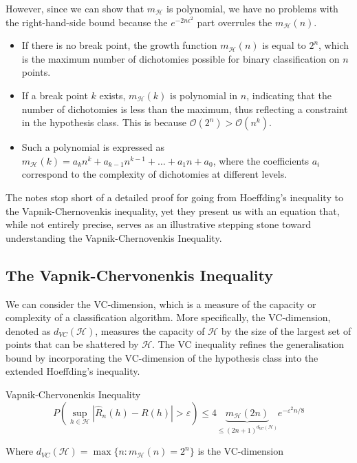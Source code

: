 However, since we can show that $m_{\mathcal{H}}$ is polynomial, we have no problems with the right-hand-side bound because the $e^{-2n\epsilon^2}$ part overrules the $m_{\mathcal{H}}(n)$.

\begin{itemize}
    \item If there is no break point, the growth function \( m_{\mathcal{H}}(n) \) is equal to \( 2^n \), which is the maximum number of dichotomies possible for binary classification on \( n \) points.
    \item If a break point \( k \) exists, \( m_{\mathcal{H}}(k) \) is polynomial in \( n \), indicating that the number of dichotomies is less than the maximum, thus reflecting a constraint in the hypothesis class. This is because $\mathcal{O}(2^n) > \mathcal{O}(n^k)$.
    \item Such a polynomial is expressed as \( m_{\mathcal{H}}(k) = a_kn^k + a_{k-1}n^{k-1} + \ldots + a_1n + a_0 \), where the coefficients \( a_i \) correspond to the complexity of dichotomies at different levels.

\end{itemize}

The notes stop short of a detailed proof for going from Hoeffding's inequality to the Vapnik-Chernovenkis inequality, yet they present us with an equation that, while not entirely precise, serves as an illustrative stepping stone toward understanding the Vapnik-Chernovenkis Inequality.




\subsection{The Vapnik-Chervonenkis Inequality}\label{vc-ineq-subsection}



We can consider the VC-dimension, which is a measure of the capacity or complexity of a classification algorithm. More specifically, the VC-dimension, denoted as \( d_{VC}(\mathcal{H}) \), measures the capacity of \( \mathcal{H} \) by the size of the largest set of points that can be shattered by \( \mathcal{H} \). The VC inequality refines the generalisation bound by incorporating the VC-dimension of the hypothesis class into the extended Hoeffding's inequality.
\begin{definitionbox}{Vapnik-Chervonenkis Inequality}
    \begin{equation*}
P\left(\sup_{h\in\mathcal{H}}|\widehat{R}_{n}(h)-R(h)|>\varepsilon\right)\leqslant4\underbrace{m_{\mathcal{H}}(2n)}_{\leqslant(2n+1)^{d_{VC}(\mathcal{H})}}e^{-\varepsilon^{2}n/8}
\end{equation*}

Where $d_{VC}(\mathcal{H})=\max\{n : m_{\mathcal{H}}(n) = 2^n\}$ is the VC-dimension
\end{definitionbox}


